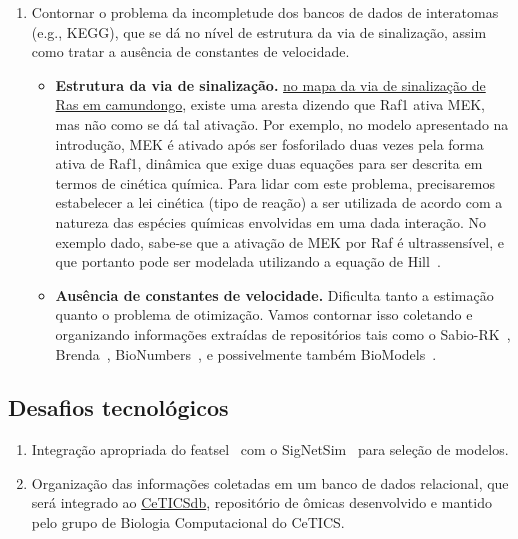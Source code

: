\documentclass[12pt]{article}
\begin{document}
\begin{enumerate}
\item Contornar o problema da incompletude dos bancos de dados de interatomas (e.g., KEGG), que se dá no nível de estrutura da via de sinalização, assim como tratar a ausência de constantes de velocidade.
  \begin{itemize}
     \item{\bf Estrutura da via de sinalização.} \href{http://www.genome.jp/kegg-bin/show\_pathway?mmu04014}{no mapa da via de sinalização de Ras em camundongo}, existe uma aresta dizendo que Raf1 ativa MEK, mas não como se dá tal ativação. Por exemplo, no modelo apresentado na introdução, MEK é ativado após ser fosforilado duas vezes pela forma ativa de Raf1, dinâmica que exige duas equações para ser descrita em termos de cinética química. Para lidar com este problema, precisaremos estabelecer a lei cinética (tipo de reação) a ser utilizada de acordo com a natureza das espécies químicas envolvidas em uma dada interação. No exemplo dado, sabe-se que a ativação de MEK por Raf é ultrassensível, e que portanto pode ser modelada utilizando a equação de Hill~\cite{huang1996ultrasensitivity}.
     \item{\bf Ausência de constantes de velocidade.} Dificulta tanto a estimação quanto o problema de otimização. Vamos contornar isso coletando e organizando informações extraídas de repositórios tais como o Sabio-RK~\cite{doi:10.1093/nar/gkr1046}, Brenda~\cite{doi:10.1093/nar/gkh081}, BioNumbers~\cite{milo2009bionumbers}, e possivelmente também  BioModels~\cite{le2006biomodels}. 
  \end{itemize}
\end{enumerate}


\subsection{Desafios tecnológicos}

\begin{enumerate}

%
\item Integração apropriada do featsel~\cite{Reis2017featsel} com o SigNetSim~\cite{Noel2017SigNetSim} para seleção de modelos.

\item Organização das informações coletadas em um banco de dados relacional, que será integrado ao \href{http://cetics.butantan.gov.br/ceticsdb/accounts/login/?next=/ceticsdb/}{CeTICSdb}, repositório de ômicas desenvolvido e mantido pelo grupo de Biologia Computacional do CeTICS.

\end{enumerate}
\end{document}
